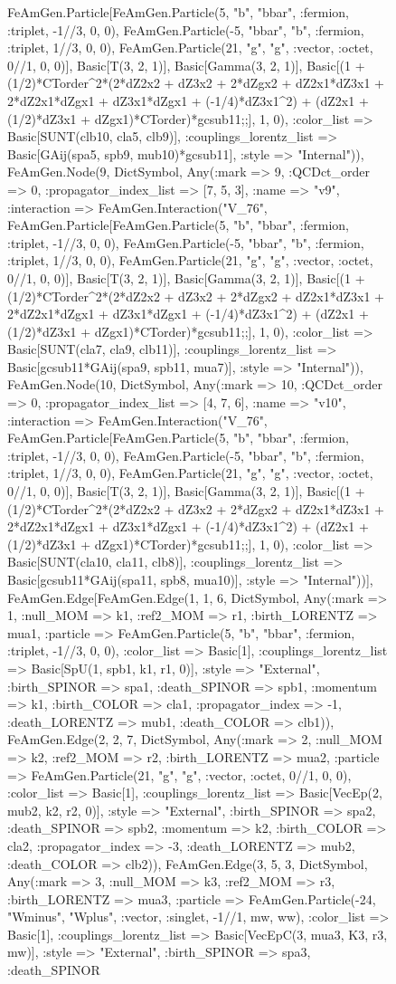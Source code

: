 \documentclass{revtex4}
\begin{document}
\begin{figure}[!htb]
\begin{center}
{FeAmGen.Particle[FeAmGen.Particle(5, "b", "bbar", :fermion, :triplet, -1//3, 0, 0), FeAmGen.Particle(-5, "bbar", "b", :fermion, :triplet, 1//3, 0, 0), FeAmGen.Particle(21, "g", "g", :vector, :octet, 0//1, 0, 0)], Basic[T(3, 2, 1)], Basic[Gamma(3, 2, 1)], Basic[(1 + (1/2)*CTorder^2*(2*dZ2x2 + dZ3x2 + 2*dZgx2 + dZ2x1*dZ3x1 + 2*dZ2x1*dZgx1 + dZ3x1*dZgx1 + (-1/4)*dZ3x1^2) + (dZ2x1 + (1/2)*dZ3x1 + dZgx1)*CTorder)*gcsub11;;], 1, 0), :color_list => Basic[SUNT(clb10, cla5, clb9)], :couplings_lorentz_list => Basic[GAij(spa5, spb9, mub10)*gcsub11], :style => "Internal")), FeAmGen.Node(9, Dict{Symbol, Any}(:mark => 9, :QCDct_order => 0, :propagator_index_list => [7, 5, 3], :name => "v9", :interaction => FeAmGen.Interaction("V_76", FeAmGen.Particle[FeAmGen.Particle(5, "b", "bbar", :fermion, :triplet, -1//3, 0, 0), FeAmGen.Particle(-5, "bbar", "b", :fermion, :triplet, 1//3, 0, 0), FeAmGen.Particle(21, "g", "g", :vector, :octet, 0//1, 0, 0)], Basic[T(3, 2, 1)], Basic[Gamma(3, 2, 1)], Basic[(1 + (1/2)*CTorder^2*(2*dZ2x2 + dZ3x2 + 2*dZgx2 + dZ2x1*dZ3x1 + 2*dZ2x1*dZgx1 + dZ3x1*dZgx1 + (-1/4)*dZ3x1^2) + (dZ2x1 + (1/2)*dZ3x1 + dZgx1)*CTorder)*gcsub11;;], 1, 0), :color_list => Basic[SUNT(cla7, cla9, clb11)], :couplings_lorentz_list => Basic[gcsub11*GAij(spa9, spb11, mua7)], :style => "Internal")), FeAmGen.Node(10, Dict{Symbol, Any}(:mark => 10, :QCDct_order => 0, :propagator_index_list => [4, 7, 6], :name => "v10", :interaction => FeAmGen.Interaction("V_76", FeAmGen.Particle[FeAmGen.Particle(5, "b", "bbar", :fermion, :triplet, -1//3, 0, 0), FeAmGen.Particle(-5, "bbar", "b", :fermion, :triplet, 1//3, 0, 0), FeAmGen.Particle(21, "g", "g", :vector, :octet, 0//1, 0, 0)], Basic[T(3, 2, 1)], Basic[Gamma(3, 2, 1)], Basic[(1 + (1/2)*CTorder^2*(2*dZ2x2 + dZ3x2 + 2*dZgx2 + dZ2x1*dZ3x1 + 2*dZ2x1*dZgx1 + dZ3x1*dZgx1 + (-1/4)*dZ3x1^2) + (dZ2x1 + (1/2)*dZ3x1 + dZgx1)*CTorder)*gcsub11;;], 1, 0), :color_list => Basic[SUNT(cla10, cla11, clb8)], :couplings_lorentz_list => Basic[gcsub11*GAij(spa11, spb8, mua10)], :style => "Internal"))], FeAmGen.Edge[FeAmGen.Edge(1, 1, 6, Dict{Symbol, Any}(:mark => 1, :null_MOM => k1, :ref2_MOM => r1, :birth_LORENTZ => mua1, :particle => FeAmGen.Particle(5, "b", "bbar", :fermion, :triplet, -1//3, 0, 0), :color_list => Basic[1], :couplings_lorentz_list => Basic[SpU(1, spb1, k1, r1, 0)], :style => "External", :birth_SPINOR => spa1, :death_SPINOR => spb1, :momentum => k1, :birth_COLOR => cla1, :propagator_index => -1, :death_LORENTZ => mub1, :death_COLOR => clb1)), FeAmGen.Edge(2, 2, 7, Dict{Symbol, Any}(:mark => 2, :null_MOM => k2, :ref2_MOM => r2, :birth_LORENTZ => mua2, :particle => FeAmGen.Particle(21, "g", "g", :vector, :octet, 0//1, 0, 0), :color_list => Basic[1], :couplings_lorentz_list => Basic[VecEp(2, mub2, k2, r2, 0)], :style => "External", :birth_SPINOR => spa2, :death_SPINOR => spb2, :momentum => k2, :birth_COLOR => cla2, :propagator_index => -3, :death_LORENTZ => mub2, :death_COLOR => clb2)), FeAmGen.Edge(3, 5, 3, Dict{Symbol, Any}(:mark => 3, :null_MOM => k3, :ref2_MOM => r3, :birth_LORENTZ => mua3, :particle => FeAmGen.Particle(-24, "Wminus", "Wplus", :vector, :singlet, -1//1, mw, ww), :color_list => Basic[1], :couplings_lorentz_list => Basic[VecEpC(3, mua3, K3, r3, mw)], :style => "External", :birth_SPINOR => spa3, :death_SPINOR }
\end{center}
\end{figure}
\end{document}
